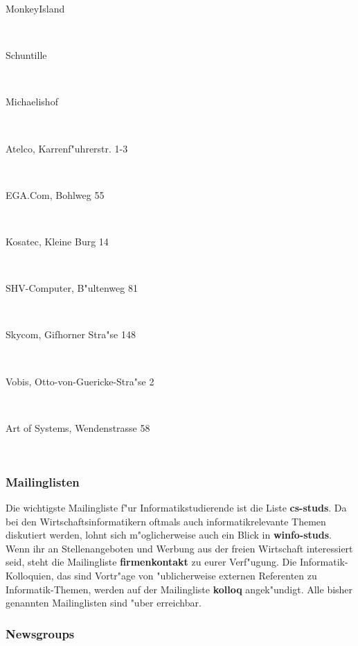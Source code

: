 \begin{description}
 \item[MonkeyIsland]~\\
 \item[Schuntille]~\\
 \item[Michaelishof]~\\
 \item[Atelco, Karrenf"uhrerstr. 1-3]~\\
 \item[EGA.Com, Bohlweg 55]~\\
 \item[Kosatec, Kleine Burg 14]~\\
 \item[SHV-Computer, B"ultenweg 81]~\\
 \item[Skycom, Gifhorner Stra"se 148]~\\
 \item[Vobis, Otto-von-Guericke-Stra"se 2]~\\
 \item[Art of Systems, Wendenstrasse 58]~\\
 \end{description}

\subsubsection*{Mailinglisten}

Die wichtigste Mailingliste f"ur Informatikstudierende ist die Liste
\textbf{cs-studs}. Da bei den Wirtschaftsinformatikern oftmals auch
informatikrelevante Themen diskutiert werden, lohnt sich m"oglicherweise auch
ein Blick in \textbf{winfo-studs}. Wenn ihr an Stellenangeboten und Werbung aus
der freien Wirtschaft interessiert seid, steht die Mailingliste
\textbf{firmenkontakt} zu eurer Verf"ugung. Die Informatik-Kolloquien, das sind
Vortr"age von "ublicherweise externen Referenten zu Informatik-Themen, werden
auf der Mailingliste \textbf{kolloq} angek"undigt. Alle bisher genannten
Mailinglisten sind "uber 
erreichbar.

\subsubsection*{Newsgroups}

